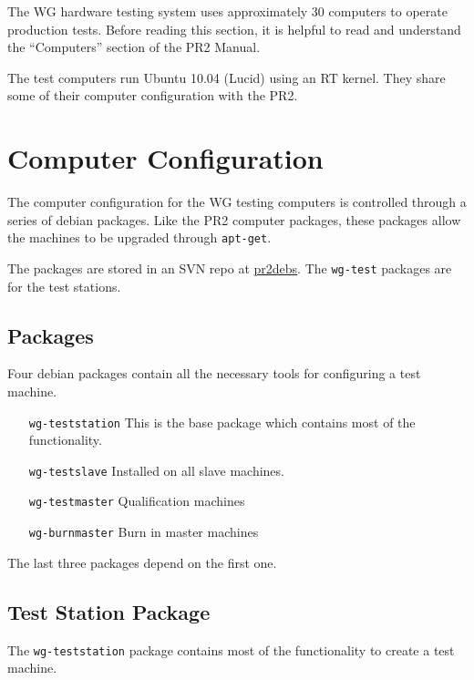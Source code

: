 \documentclass[11pt]{report}
\begin{document}
The WG hardware testing system uses approximately 30 computers to operate production tests. Before reading this section, it is helpful to read and understand the ``Computers'' section of the PR2 Manual.

The test computers run Ubuntu 10.04 (Lucid) using an RT kernel. They share some of their computer configuration with the PR2.

\section{Computer Configuration}

The computer configuration for the WG testing computers is controlled through a series of debian packages. Like the PR2 computer packages, these packages allow the machines to be upgraded through \texttt{apt-get}.

The packages are stored in an SVN repo at \href{https://code.ros.org/svn/pr2debs/trunk}{pr2debs}. The \texttt{wg-test} packages are for the test stations.

\subsection{Packages}

Four debian packages contain all the necessary tools for configuring a test machine. 

\begin{itemize}
\item [\texttt{wg-teststation}] This is the base package which contains most of the functionality.
\item [\texttt{wg-testslave}] Installed on all slave machines.
\item [\texttt{wg-testmaster}] Qualification machines
\item [\texttt{wg-burnmaster}] Burn in master machines
\end{itemize}

The last three packages depend on the first one. 

\subsection{Test Station Package}

The \texttt{wg-teststation} package contains most of the functionality to create a test machine.
\end{document}
